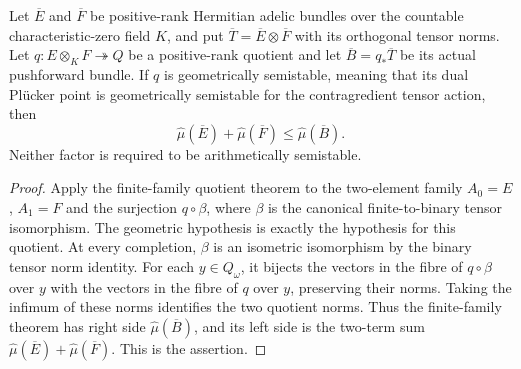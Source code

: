\begin{theorem}
\label{thm:geometric-quotient-bound}
\leanok
Let $\overline E$ and $\overline F$ be positive-rank Hermitian adelic bundles
over the countable characteristic-zero field $K$, and put
$\overline T=\overline E\otimes\overline F$ with its orthogonal tensor norms.
Let $q:E\otimes_K F\twoheadrightarrow Q$ be a positive-rank quotient and
let $\overline B=q_*\overline T$ be its actual pushforward bundle.
If $q$ is geometrically semistable, meaning that its dual Pl\"ucker point
is geometrically semistable for the contragredient tensor action, then
\[
 \widehat\mu(\overline E)+\widehat\mu(\overline F)
     \leq\widehat\mu(\overline B).
\]
Neither factor is required to be arithmetically semistable.
\end{theorem}
\begin{proof}
Apply the finite-family quotient theorem to the two-element family
$A_0=E$, $A_1=F$ and the surjection $q\circ\beta$, where $\beta$ is the
canonical finite-to-binary tensor isomorphism. The geometric hypothesis is
exactly the hypothesis for this quotient. At every completion, $\beta$ is
an isometric isomorphism by the binary tensor norm identity. For each
$y\in Q_\omega$, it bijects the vectors in the fibre of $q\circ\beta$ over
$y$ with the vectors in the fibre of $q$ over $y$, preserving their norms.
Taking the infimum of these norms identifies the two quotient norms.
Thus the finite-family theorem has right side $\widehat\mu(\overline B)$,
and its left side is the two-term sum
$\widehat\mu(\overline E)+\widehat\mu(\overline F)$. This is the assertion.
\end{proof}
